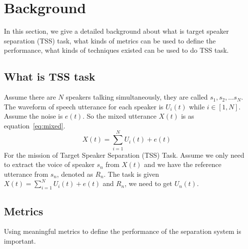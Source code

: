 

\section{Background}\label{sec:background}

In this section, we give a detailed background about what is target speaker separation (TSS) task, what kinds of metrics can be used to define the performance, what kinds of techniques existed can be used to do TSS task.

\subsection{What is TSS task}\label{subsec:what-is-tss-task}

Assume there are $N$ speakers talking simultaneously, they are called $s_1, s_2, \dots s_N$. The waveform of speech utterance for each speaker is $U_i\left( t \right)$ while $i\in\left[ 1, N \right]$. Assume the noise is $e\left( t \right)$.
So the mixed utterance $X\left( t \right)$ is as equation~\ref{eq:mixed}.
\begin{equation}
    X\left( t \right) = \sum\limits_{i=1}^N U_i\left( t \right) + e\left( t \right)
    \label{eq:mixed}
\end{equation}
For the mission of Target Speaker Separation (TSS) Task. Assume we only need to extract the voice of speaker $s_n$ from $X\left( t \right)$ and we have the reference utterance from $s_n$, denoted as $R_n$.
The task is given $X\left( t \right) = \sum\limits_{i=1}^N U_i\left( t \right) + e\left( t \right)$ and $R_n$, we need to get $U_n\left( t \right)$.

\subsection{Metrics}\label{subsec:metrics}

Using meaningful metrics to define the performance of the separation system is important.

